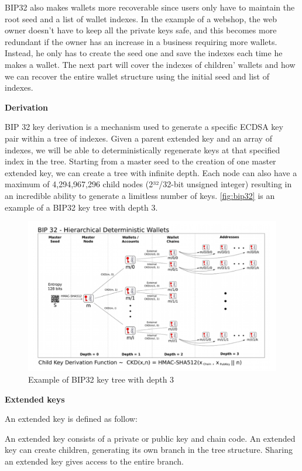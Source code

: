 BIP32 also makes wallets more recoverable since users only have to maintain the root seed and a list of wallet indexes. In the example of a webshop, the web owner doesn’t have to keep all the private keys safe, and this becomes more redundant if the owner has an increase in a business requiring more wallets. Instead, he only has to create the seed one and save the indexes each time he makes a wallet. The next part will cover the indexes of children’ wallets and how we can recover the entire wallet structure using the initial seed and list of indexes.

\bigskip
{\textbf{Derivation}}

BIP 32 key derivation is a mechanism used to generate a specific ECDSA key pair within a tree of indexes. Given a parent extended key and an array of indexes, we will be able to deterministically regenerate keys at that specified index in the tree. Starting from a master seed to the creation of one master extended key, we can create a tree with infinite depth. Each node can also have a maximum of 4,294,967,296 child nodes (2³²/32-bit unsigned integer) resulting in an incredible ability to generate a limitless number of keys. \autoref{fig:bip32} is an example of a BIP32 key tree with depth 3.

\begin{figure}[ht!]
    \centering
    \includegraphics[width=1\textwidth]{images/bip32.png}
    \caption[Example of BIP32 key tree with depth 3]{Example of BIP32 key tree with depth 3}
    \label{fig:bip32}
\end{figure}


\bigskip
{\textbf{Extended keys}}

An extended key is defined as follow:

\begin{adjustwidth}{2cm}{}
    An extended key consists of a private or public key and chain code. An extended key can create children, generating its own branch in the tree structure. Sharing an extended key gives access to the entire branch.
\end{adjustwidth}

